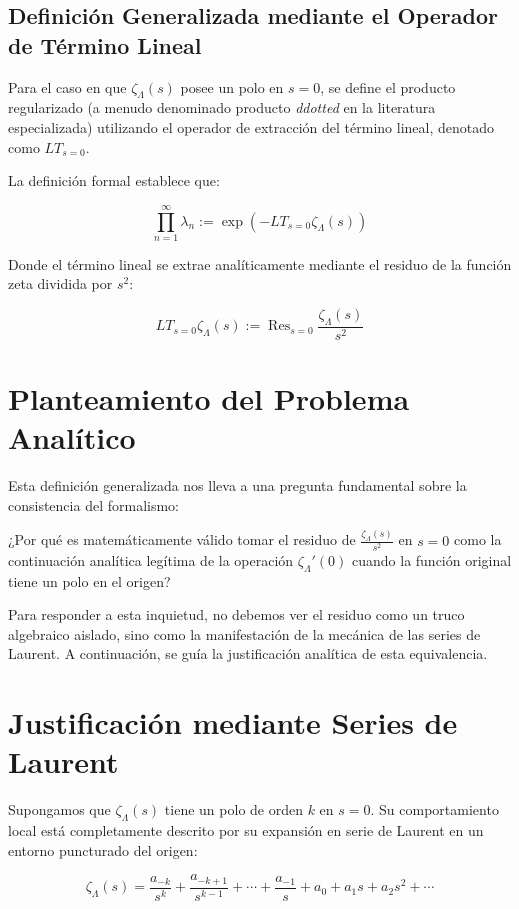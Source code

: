 \documentclass{article}
\begin{document}
\subsection{Definición Generalizada mediante el Operador de Término Lineal}

Para el caso en que $\zeta_\Lambda(s)$ posee un polo en $s=0$, se define el producto regularizado (a menudo denominado producto \textit{ddotted} en la literatura especializada) utilizando el operador de extracción del término lineal, denotado como $LT_{s=0}$. 

La definición formal establece que:

\[
\prod_{n=1}^{\infty} \lambda_n := \exp\left(-LT_{s=0} \zeta_\Lambda(s)\right)
\]

Donde el término lineal se extrae analíticamente mediante el residuo de la función zeta dividida por $s^2$:

\[
LT_{s=0} \zeta_\Lambda(s) := \operatorname{Res}_{s=0} \frac{\zeta_\Lambda(s)}{s^2}
\]

\section{Planteamiento del Problema Analítico}

Esta definición generalizada nos lleva a una pregunta fundamental sobre la consistencia del formalismo: 

¿Por qué es matemáticamente válido tomar el residuo de $\frac{\zeta_\Lambda(s)}{s^2}$ en $s=0$ como la continuación analítica legítima de la operación $\zeta_\Lambda'(0)$ cuando la función original tiene un polo en el origen? 

Para responder a esta inquietud, no debemos ver el residuo como un truco algebraico aislado, sino como la manifestación de la mecánica de las series de Laurent. A continuación, se guía la justificación analítica de esta equivalencia.

\section{Justificación mediante Series de Laurent}

Supongamos que $\zeta_\Lambda(s)$ tiene un polo de orden $k$ en $s=0$. Su comportamiento local está completamente descrito por su expansión en serie de Laurent en un entorno puncturado del origen:

\[
\zeta_\Lambda(s) = \frac{a_{-k}}{s^k} + \frac{a_{-k+1}}{s^{k-1}} + \cdots + \frac{a_{-1}}{s} + a_0 + a_1 s + a_2 s^2 + \cdots
\]
\end{document}

